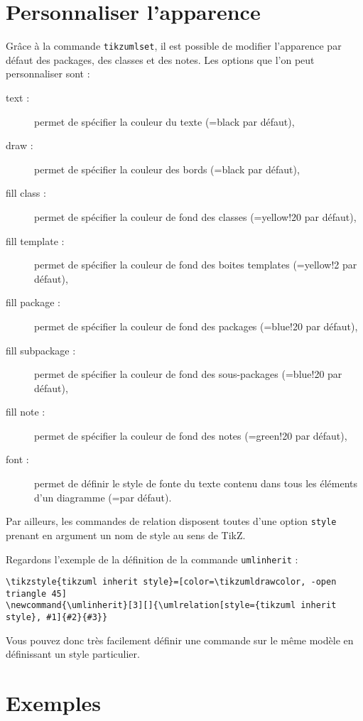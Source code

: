 \documentclass[a4paper,11pt]{article}
\begin{document}
\section{Personnaliser l'apparence}

Grâce à la commande {\tt tikzumlset}, il est possible de modifier l'apparence par défaut des packages, des classes et des notes. Les options que l'on peut personnaliser sont :

\begin{description}
\item[text : ] permet de spécifier la couleur du texte (=black par défaut),
\item[draw :] permet de spécifier la couleur des bords (=black par défaut),
\item[fill class :] permet de spécifier la couleur de fond des classes (=yellow!20 par défaut),
\item[fill template :] permet de spécifier la couleur de fond des boites templates (=yellow!2 par défaut),
\item[fill package :] permet de spécifier la couleur de fond des packages (=blue!20 par défaut),
\item[fill subpackage :] permet de spécifier la couleur de fond des sous-packages (=blue!20 par défaut),
\item[fill note :] permet de spécifier la couleur de fond des notes (=green!20 par défaut),
\item[font :] permet de définir le style de fonte du texte contenu dans tous les éléments d'un diagramme (=\small par défaut).
\end{description}

Par ailleurs, les commandes de relation disposent toutes d'une option {\tt style} prenant en argument un nom de style au sens de TikZ.

Regardons l'exemple de la définition de la commande {\tt umlinherit} :

\begin{lstlisting}
\tikzstyle{tikzuml inherit style}=[color=\tikzumldrawcolor, -open triangle 45]
\newcommand{\umlinherit}[3][]{\umlrelation[style={tikzuml inherit style}, #1]{#2}{#3}}
\end{lstlisting}

Vous pouvez donc très facilement définir une commande sur le même modèle en définissant un style particulier.

\section{Exemples}
\end{document}
